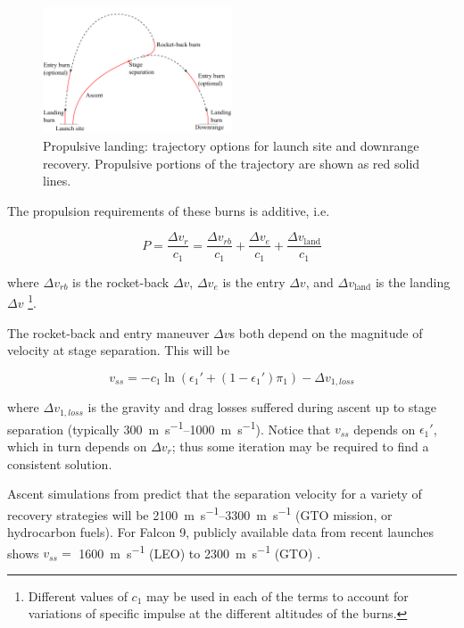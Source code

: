 \documentclass[conf]{new-aiaa}
\begin{document}
\begin{figure}[hbt!]
	\centering
	\includegraphics[width=0.5\textwidth]{figures/propulsive_landing}
	\caption{\label{fig:propulsive_landing} Propulsive landing: trajectory options for launch site and downrange recovery. Propulsive portions of the trajectory are shown as red solid lines.}
\end{figure}

The propulsion requirements of these burns is additive, i.e.

\begin{equation}
P = \frac{\Delta v_r}{c_1} = \frac{\Delta v_{rb}}{c_1} + \frac{\Delta v_{e}}{c_1} + \frac{\Delta v_{\mathrm{land}}}{c_1}
\end{equation}

where $\Delta v_{rb}$ is the rocket-back $\Delta v$, $\Delta v_{e}$ is the entry $\Delta v$, and $\Delta v_{\mathrm{land}}$ is the landing $\Delta v$ \footnote{Different values of $c_1$ may be used in each of the terms to account for variations of specific impulse at the different altitudes of the burns.}.



The rocket-back and entry maneuver $\Delta v$s both depend on the magnitude of velocity at stage separation. This will be

\begin{equation}
v_{ss} = - c_1 \ln\left( \epsilon_1' + (1 - \epsilon_1') \pi_1 \right) - \Delta v_{1,loss}
\end{equation}

where $\Delta v_{1,loss}$ is the gravity and drag losses suffered during ascent up to stage separation (typically \SIrange{300}{1000}{\meter\per\second}). Notice that $v_{ss}$ depends on $\epsilon_1'$, which in turn depends on $\Delta v_r$; thus some iteration may be required to find a consistent solution.

Ascent simulations from \cite{Stappert2017} predict that the separation velocity for a variety of recovery strategies will be \SIrange{2100}{3300}{\meter\per\second} (GTO mission,  or hydrocarbon fuels). For Falcon 9, publicly available data from recent launches shows $v_{ss} =$ \SI{1600}{\meter\per\second} (LEO) to \SI{2300}{\meter\per\second} (GTO) \cite{SpaceXWebcast}.
\end{document}
